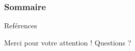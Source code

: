 \documentclass[compress]{beamer}
\begin{document}


\begin{frame}
  \frametitle{Sommaire}
  \tableofcontents
\end{frame}
















\appendix   %


\begin{frame}[plain,t]{Reférences}
  \tiny
  \printbibliography
\end{frame}


  \begin{frame}[plain]
    \Large
    \begin{exampleblock}{\centering \LARGE Merci pour votre attention \Large \Smiley{} !}\LARGE
      \centering
      Questions ?
    \end{exampleblock}

  \end{frame}
\end{document}
